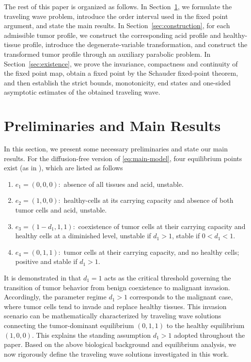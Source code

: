 \documentclass[preprint,sort&compress,final,12pt]{elsarticle}
\numberwithin{equation}{section}
\begin{document}
The rest of this paper is organized as follows. In Section~\ref{Preliminaries and Main Results}, we formulate the traveling wave problem, introduce the order interval used in the fixed point argument, and state the main results. In Section~\ref{sec:construction},
for each admissible tumor profile, we construct the corresponding acid profile and healthy-tissue profile, introduce the degenerate-variable transformation, and construct the transformed tumor profile through an auxiliary parabolic problem. In Section~\ref{sec:existence}, we prove the invariance, compactness and continuity of the fixed point map, obtain a fixed point by the Schauder fixed-point theorem, and then establish the strict bounds, monotonicity, end states and one-sided asymptotic estimates of the obtained traveling wave.

\section{Preliminaries and Main Results}\label{Preliminaries and Main Results}
In this section, we present some necessary preliminaries and state our main results. For the diffusion-free version of \eqref{eq:main-model}, four equilibrium points exist (as in \cite{producing lactic acid,J.B. McGillen JMB,2023 Li Fang JDE,2024 Lifang ZAMP}), which are listed as follows
\begin{enumerate}
\item[$\bullet$] $e_1=(0,0,0)$:\ absence of all tissues and acid, unstable.
\item[$\bullet$] $e_2=(1,0,0)$:\ 
healthy-cells at its carrying capacity and absence of both tumor cells and acid, unstable.
\item[$\bullet$] $e_3=(1-d_1,1,1)$:\ coexistence of tumor cells at their carrying capacity and healthy cells at a diminished level,  unstable if $d_1>1$,  stable if $0<d_1<1$. 
\item[$\bullet$] $e_4=(0,1,1)$:\  tumor cells at their carrying capacity,  and no healthy cells; positive and stable if $d_1>1$.
\end{enumerate}

It is demonstrated in \cite{producing lactic acid} that $d_1=1$ acts as the critical threshold governing the transition of tumor behavior from benign coexistence to malignant invasion. Accordingly, the parameter regime $d_1>1$ corresponds to the malignant case, where tumor cells tend to invade and replace healthy tissues. This invasion scenario can be mathematically characterized by traveling wave solutions connecting the tumor-dominant equilibrium $(0,1,1)$ to the healthy equilibrium $(1,0,0)$. This explains the standing assumption $d_1>1$ adopted throughout the paper. Based on the above biological background and equilibrium analysis, we now rigorously define the traveling wave solutions investigated in this work.
\end{document}
